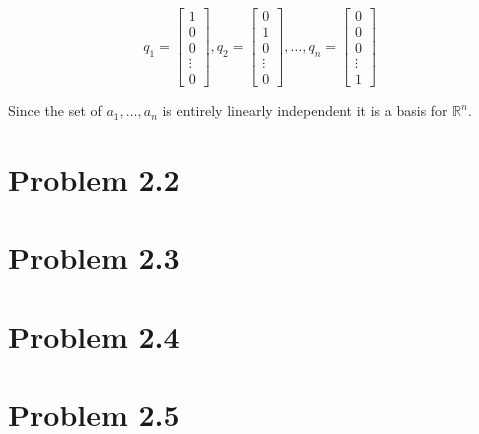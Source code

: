 \documentclass[20pt]{article}
\begin{document}
\begin{equation}
    q_1 = \begin{bmatrix}
        1      \\
        0      \\
        0      \\
        \vdots \\
        0
    \end{bmatrix}, q_2 = \begin{bmatrix}
        0      \\
        1      \\
        0      \\
        \vdots \\
        0
    \end{bmatrix}, \dots, q_n = \begin{bmatrix}
        0      \\
        0      \\
        0      \\
        \vdots \\
        1
    \end{bmatrix}
\end{equation}

Since the set of $a_1, \dots , a_n$ is entirely linearly independent it is a basis for $\mathbb{R}^n$.
\newpage
\section*{Problem 2.2}
\newpage
\section*{Problem 2.3}
\newpage

\section*{Problem 2.4}
\newpage

\section*{Problem 2.5}
\end{document}
